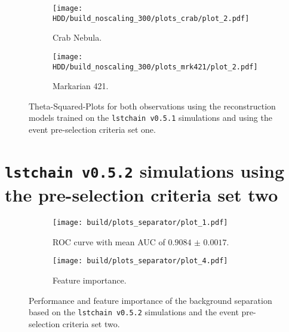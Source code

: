 \begin{figure}
    \centering
    \begin{subfigure}{0.49\textwidth}
        \centering
        \texttt{[image: HDD/build\_noscaling\_300/plots\_crab/plot\_2.pdf]}
        \caption{Crab Nebula.}
        \label{fig:crab_oldMC_300}
    \end{subfigure}
    \hfill
    \begin{subfigure}{0.49\textwidth}
        \centering
        \texttt{[image: HDD/build\_noscaling\_300/plots\_mrk421/plot\_2.pdf]}
        \caption{Markarian 421.}
        \label{fig:mrk_oldMC_300}
    \end{subfigure}
    \caption{Theta-Squared-Plots for both observations using the reconstruction models trained on the \texttt{lstchain v0.5.1} simulations and using 
        the event pre-selection criteria set one.
    }
    \label{fig:obs_oldMC_300}
\end{figure}


\section{\texttt{lstchain v0.5.2} simulations using the pre-selection criteria set two}
\begin{figure}
    \centering
    \begin{subfigure}{0.49\textwidth}
        \centering
        \texttt{[image: build/plots\_separator/plot\_1.pdf]}
        \caption{ROC curve with mean AUC of $\num{0.9084(17)}$.}
        \label{fig:separator_newMC_150}
    \end{subfigure}
    \hfill
    \begin{subfigure}{0.49\textwidth}
        \centering
        \texttt{[image: build/plots\_separator/plot\_4.pdf]}
        \caption{Feature importance.}
        \label{fig:separator_newMC_150_feature}
    \end{subfigure}
    \caption{Performance and feature importance of the background separation based on the \texttt{lstchain v0.5.2} simulations and the event pre-selection criteria set two.}
\end{figure}

